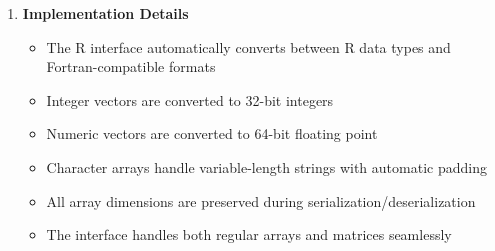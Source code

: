 \documentclass[11pt]{article}
\begin{document}
\begin{enumerate}
\begin{enumerate}
	      	      \textbf{Deserialization Functions:}
	      	      \begin{itemize}
	      	      	\item \texttt{filename} (input): Name of the binary file to read \\ \textbf{Type:}
	      	      	      \texttt{character}
	      	      	      
	      	      	\item \textbf{Return Value:} Deserialized R array with original
	      	      	      dimensions \\ \textbf{Type:} \texttt{array}, \texttt{matrix}, or \texttt{vector}
	      	      	      \\ \textbf{Data Type:} Same as original
	      	      \end{itemize}
	      	      \begin{lstlisting}[language=R, caption={R Array Deserialization Example}]
restored_int <- tox_deserialize_int_array(filename)
restored_real <- tox_deserialize_real_array(filename)
restored_char <- tox_deserialize_char_array(filename)
	      	      \end{lstlisting}
	      	      
	      	\item \textbf{Implementation Details}
	      	      
	      	      \begin{itemize}
	      	      	\item The R interface automatically converts between R data types and
	      	      	      Fortran-compatible formats
	      	      	      
	      	      	\item Integer vectors are converted to 32-bit integers
	      	      	      
	      	      	\item Numeric vectors are converted to 64-bit floating point
	      	      	      
	      	      	\item Character arrays handle variable-length strings with automatic
	      	      	      padding
	      	      	      
	      	      	\item All array dimensions are preserved during serialization/deserialization
	      	      	      
	      	      	\item The interface handles both regular arrays and matrices seamlessly
	      	      \end{itemize}
	      	      

\end{enumerate}
\end{enumerate}
\end{document}
